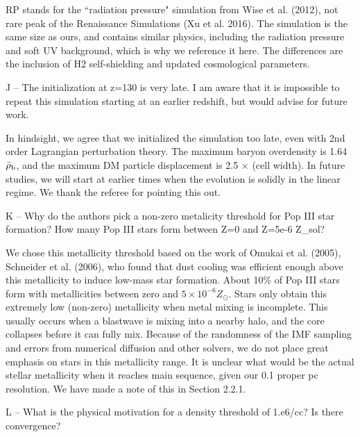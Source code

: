 \documentclass[11pt]{article}
\newenvironment{referee}[1][]{%
    \ignorespaces%
    \begin{mdframed}[style=myquotestyle,#1]%
}{%
    \end{mdframed}%
    \ignorespacesafterend%
}%
\begin{document}
RP stands for the ``radiation pressure" simulation from Wise et al. (2012), not rare peak of the Renaissance Simulations (Xu et al. 2016). The simulation is the same size as ours, and contains similar physics, including the radiation pressure and soft UV background, which is why we reference it here. The differences are the inclusion of H2 self-shielding and updated cosmological parameters.
 
\begin{referee}
J -- The initialization at z=130 is very late. I am aware that it is impossible to repeat this simulation starting at an earlier redshift, but would advise for future work.
\end{referee}

In hindsight, we agree that we initialized the simulation too late, even with 2nd order Lagrangian perturbation theory.  The maximum baryon overdensity is 1.64$\bar{\rho}_{\rm b}$, and the maximum DM particle displacement is 2.5 $\times$ (cell width).  In future studies, we will start at earlier times when the evolution is solidly in the linear regime.  We thank the referee for pointing this out.

\begin{referee}
K -- Why do the authors pick a non-zero metalicity threshold for Pop III star formation? How many Pop III stars form between Z=0 and Z=5e-6 Z\_sol?
\end{referee}

We chose this metallicity threshold based on the work of Omukai et al. (2005), Schneider et al. (2006), who found that dust cooling was efficient enough above this metallicity to induce low-mass star formation. About 10\% of Pop III stars form with metallicities between zero and $5 \times 10^{-6} Z_\odot$.  Stars only obtain this extremely low (non-zero) metallicity when metal mixing is incomplete.  This usually occurs when a blastwave is mixing into a nearby halo, and the core collapses before it can fully mix.  Because of the randomness of the IMF sampling and errors from numerical diffusion and other solvers, we do not place great emphasis on stars in this metallicity range.  It is unclear what would be the actual stellar metallicity when it reaches main sequence, given our 0.1 proper pc resolution.  We have made a note of this in Section 2.2.1.

\begin{referee}
L -- What is the physical motivation for a density threshold of 1.e6/cc? Is there convergence?
\end{referee}
\end{document}
